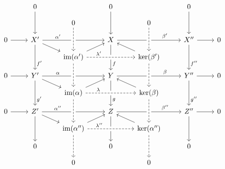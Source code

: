 \begin{equation}
  \label{enriched 3x3 diagram}
  \begin{tikzcd}[row sep = small]
      {}
    & 0
      \arrow{dd}
    & {}
    & 0
      \arrow{dd}
    & {}
    & 0
      \arrow{dd}
    & {}
  \\
      {}
    & {}
    & 0
    & {}
    & 0
    & {}
    & {}
  \\
      0
      \arrow{r}
    & X'
      \arrow{rr}[above,near start]{\alpha'}
      \arrow{dr}
      \arrow{dd}[right,near end]{f'}
    & {}
    & X
      \arrow{rr}[above,near end]{\beta'}
      \arrow{dd}[right,near end]{f}
    & {}
    & X''
      \arrow{r}
      \arrow{dd}[right,near end]{f''}
    & 0
    \\
      {}
    & {}
    & \im(\alpha')
      \arrow[from=uu,dashed,crossing over]
      \arrow{ur}
    & {}
    & \ker(\beta')
      \arrow{ul}
      \arrow[from=uu,dashed,crossing over]
      \arrow[from=ll, dashed, crossing over, "\lambda'", near start]
    & {}
    & {}
  \\
      0
      \arrow{r}
    & Y'
      \arrow{rr}[above,near start]{\alpha}
      \arrow{dr}
      \arrow{dd}[right,near end]{g'}
    & {}
    & Y
      \arrow{rr}[above,near end]{\beta}
      \arrow{dd}[right,near end]{g}
    & {}
    & Y''
      \arrow{r}
      \arrow{dd}[right,near end]{g''}
    & 0
    \\
      {}
    & {}
    & \im(\alpha)
      \arrow[from=uu,dashed,crossing over]
      \arrow{ur}
    & {}
    & \ker(\beta)
      \arrow{ul}
      \arrow[from=uu,dashed,crossing over]
      \arrow[from=ll, dashed, crossing over, "\lambda", near start]
    & {}
    & {}
  \\
      0
      \arrow{r}
    & Z'
      \arrow{rr}[above,near start]{\alpha''}
      \arrow{dr}
      \arrow{dd}
    & {}
    & Z
      \arrow{rr}[above,near end]{\beta''}
      \arrow{dd}
    & {}
    & Z''
      \arrow{r}
      \arrow{dd}
    & 0
    \\
      {}
    & {}
    & \im(\alpha'')
      \arrow[from=uu,dashed,crossing over]
      \arrow{ur}
    & {}
    & \ker(\alpha'')
      \arrow{ul}
      \arrow[from=uu,dashed,crossing over]
      \arrow[from=ll, dashed, crossing over, "\lambda''", near start]
    & {}
    & {}
    \\
      {}
    & 0
    & {}
    & 0
    & {}
    & 0
    & {}
    \\
      {}
    & {}
    & 0
      \arrow[from=uu,dashed,crossing over]
    & {}
    & 0
      \arrow[from=uu,dashed,crossing over]
    & {}
    & {}
  \end{tikzcd}
\end{equation}
